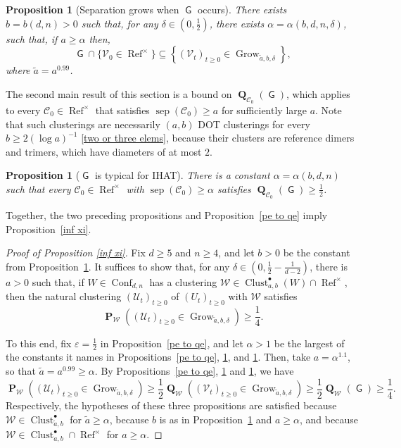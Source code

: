 \documentclass[11pt,reqno]{amsart}
\newtheorem{proposition}[lemma]{Proposition}
\theoremstyle{definition}
\numberwithin{equation}{section}
\newcommand{\1}{\mathbf{1}}
\DeclareMathOperator{\PP}{\mathbf{P}}
\DeclareMathOperator{\QQ}{\mathbf{Q}}
\DeclareMathOperator{\sep}{sep}
\DeclareMathOperator{\Refcon}{\mathrm{Ref}}
\DeclareMathOperator{\GG}{\mathsf{G}}
\newcommand{\CC}{\mathcal{C}}
\newcommand{\UU}{\mathcal{U}}
\newcommand{\VV}{\mathcal{V}}
\DeclareMathOperator{\Conf}{\mathrm{Conf}}
\DeclareMathOperator{\Clust}{\mathrm{Clust}}
\DeclareMathOperator{\Grow}{\mathrm{Grow}}
\begin{document}
\begin{proposition}[Separation grows when $\GG$ occurs]\label{rel sep bd}
There exists $b = b(d,n) > 0$ such that, for any $\delta \in (0,\frac12)$, there exists $\alpha = \alpha (b,d,n,\delta)$, such that, if $a \geq \alpha$ then, 
\begin{equation}\label{g v ref}
\GG \cap \{\VV_0 \in \Refcon^\times\} \subseteq \left\{ (\VV_t)_{t \geq 0} \in \Grow_{\tilde a,b,\delta} \right\},
\end{equation}
where $\tilde a = a^{0.99}$.
\end{proposition}

The second main result of this section is a bound on $\QQ_{\CC_0} (\GG)$, which applies to every $\CC_0 \in \Refcon^\times$ that satisfies $\sep (\CC_0) \geq a$ for sufficiently large $a$. Note that such clusterings are necessarily $(a,b)$ DOT clusterings for every $b \geq 2 (\log a)^{-1}$ \eqref{two or three elems}, because their clusters are reference dimers and trimers, which have diameters of at most $2$.


\begin{proposition}[$\GG$ is typical for IHAT]\label{tl ntb}
There is a constant $\alpha = \alpha (b,d,n)$ such that every $\CC_0 \in \Refcon^\times$ with $\sep (\CC_0) \geq \alpha$ satisfies $\QQ_{\CC_0} (\GG) \geq \frac12$.
\end{proposition}

Together, the two preceding propositions and Proposition~\ref{pe to qe} imply Proposition~\ref{inf xi}.

\begin{proof}[Proof of Proposition \ref{inf xi}]
Fix $d \geq 5$ and $n \geq 4$, and let $b > 0$ be the constant from Proposition~\ref{rel sep bd}. It suffices to show that, for any $\delta \in (0,\frac12 - \frac{1}{d-2})$, there is $a > 0$ such that, if $W \in \Conf_{d,n}$ has a clustering $\mathcal{W} \in \Clust_{a,b}^\bullet (W) \cap \Refcon^\times$, then the natural clustering $(\UU_t)_{t \geq 0}$ of $(U_t)_{t \geq 0}$ with $\mathcal{W}$ satisfies
\[
\PP_{\mathcal{W}} \left( (\UU_t)_{t \geq 0} \in \Grow_{\tilde a, b, \delta} \right) \geq \frac14.
\]

To this end, fix $\varepsilon = \frac12$ in Proposition~\ref{pe to qe}, and let $\alpha > 1$ be the largest of the constants it names in Propositions~\ref{pe to qe}, \ref{rel sep bd}, and \ref{tl ntb}. Then, take $a = \alpha^{1.1}$, so that $\tilde a = a^{0.99} \geq \alpha$. By Propositions~\ref{pe to qe}, \ref{rel sep bd} and \ref{tl ntb}, we have
\[
\PP_{\mathcal{W}} \left( (\UU_t)_{t \geq 0} \in \Grow_{\tilde a, b, \delta} \right) \geq \frac12 \QQ_{\mathcal{W}} \left( (\VV_t)_{t \geq 0} \in \Grow_{\tilde a, b, \delta} \right) \geq \frac12 \QQ_{\mathcal{W}} ( \GG ) \geq \frac14.
\]
Respectively, the hypotheses of these three propositions are satisfied because $\mathcal{W} \in \Clust_{\tilde a,b}^\bullet$ for $\tilde a \geq \alpha$, because $b$ is as in Proposition~\ref{rel sep bd} and $a \geq \alpha$, and because $\mathcal{W} \in \Clust_{a,b}^\bullet \cap \Refcon^\times$ for $a \geq \alpha$.
\end{proof} 
\end{document}
